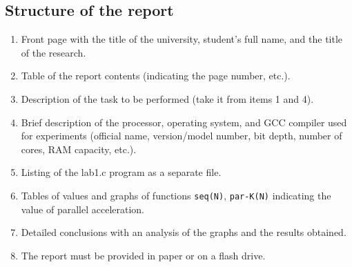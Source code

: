 { %
	\subsection{Structure of the report}
	\begin{enumerate}
		\item Front page with the title of the university, student's full name, and the title of the research.
		\item Table of the report contents (indicating the page number, etc.).
		\item Description of the task to be performed (take it from items 1 and 4).
		\item Brief description of the processor, operating system, and GCC compiler used for experiments (official name, version/model number, bit depth, number of cores, RAM capacity, etc.).
		\item Listing of the lab1.c program as a separate file.
		\item Tables of values and graphs of functions \texttt{seq(N)}, \texttt{par-K(N)} indicating the value of parallel acceleration.
		\item Detailed conclusions with an analysis of the graphs and the results obtained.
		\item The report must be provided in paper or on a flash drive.
	\end{enumerate}
}